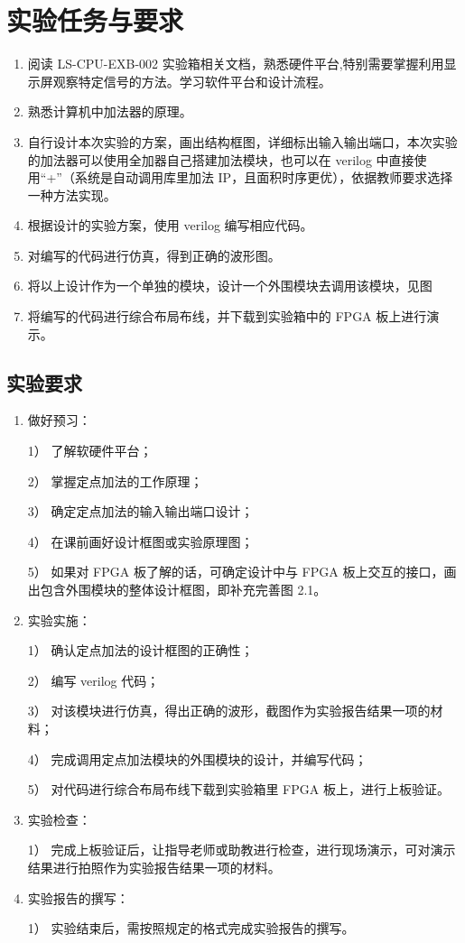 \documentclass[AutoFakeBold]{LZUThesis}
\begin{document}
\chapter{实验任务与要求}
\begin{enumerate}
    \item 阅读 LS-CPU-EXB-002 实验箱相关文档，熟悉硬件平台,特别需要掌握利用显示屏观察特定信号的方法。学习软件平台和设计流程。
    \item 熟悉计算机中加法器的原理。
    \item 自行设计本次实验的方案，画出结构框图，详细标出输入输出端口，本次实验的加法器可以使用全加器自己搭建加法模块，也可以在 verilog 中直接使用“+”（系统是自动调用库里加法 IP，且面积时序更优），依据教师要求选择一种方法实现。
    \item 根据设计的实验方案，使用 verilog 编写相应代码。
    \item 对编写的代码进行仿真，得到正确的波形图。
    \item 将以上设计作为一个单独的模块，设计一个外围模块去调用该模块，见图
    \item 将编写的代码进行综合布局布线，并下载到实验箱中的 FPGA 板上进行演示。
\end{enumerate}
\section{实验要求}
\begin{enumerate}
    \item 做好预习：\par
        1） 了解软硬件平台；\par
        2） 掌握定点加法的工作原理；\par
        3） 确定定点加法的输入输出端口设计；\par
        4） 在课前画好设计框图或实验原理图；\par
        5） 如果对 FPGA 板了解的话，可确定设计中与 FPGA 板上交互的接口，画出包含外围模块的整体设计框图，即补充完善图 2.1。\par
    \item 实验实施：\par
        1） 确认定点加法的设计框图的正确性；\par
        2） 编写 verilog 代码；\par
        3） 对该模块进行仿真，得出正确的波形，截图作为实验报告结果一项的材料；\par
        4） 完成调用定点加法模块的外围模块的设计，并编写代码；\par
        5） 对代码进行综合布局布线下载到实验箱里 FPGA 板上，进行上板验证。\par
    \item 实验检查：\par
        1） 完成上板验证后，让指导老师或助教进行检查，进行现场演示，可对演示结果进行拍照作为实验报告结果一项的材料。\par
    \item 实验报告的撰写：\par
        1） 实验结束后，需按照规定的格式完成实验报告的撰写。\par
\end{enumerate}
\end{document}
